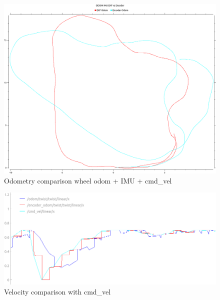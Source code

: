 \begin{figure}
	\includegraphics[width=\textwidth]{Pictures/odom after one round}
	\caption{Odometry comparison wheel odom + IMU + cmd\_vel}
	\label{Odometry comparison wheel odomIMUcmdvel}

\end{figure}
\begin{figure}
	\includegraphics[width=\textwidth]{Pictures/circle vel}
	\caption{Velocity comparison with cmd\_vel}
	\label{velwithcmd}
\end{figure}



